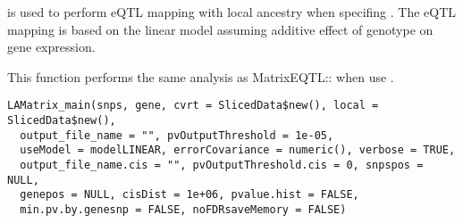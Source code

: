 \documentclass[a4paper]{book}
\begin{document}
%
\begin{Description}\relax
{} is used to perform eQTL mapping with local ancestry when specifing .
The eQTL mapping is based on the linear model assuming additive effect of genotype on gene expression.

This function performs the same analysis as MatrixEQTL:: when use .
\end{Description}
%
\begin{Usage}
\begin{verbatim}
LAMatrix_main(snps, gene, cvrt = SlicedData$new(), local = SlicedData$new(),
  output_file_name = "", pvOutputThreshold = 1e-05,
  useModel = modelLINEAR, errorCovariance = numeric(), verbose = TRUE,
  output_file_name.cis = "", pvOutputThreshold.cis = 0, snpspos = NULL,
  genepos = NULL, cisDist = 1e+06, pvalue.hist = FALSE,
  min.pv.by.genesnp = FALSE, noFDRsaveMemory = FALSE)
\end{verbatim}
\end{Usage}
%
\end{document}
